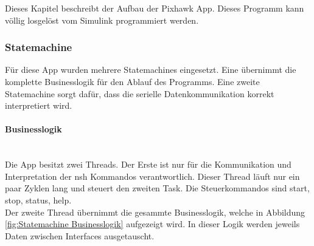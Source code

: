 Dieses Kapitel beschreibt der Aufbau der Pixhawk App. Dieses Programm kann völlig losgelöst vom Simulink programmiert werden.


\subsubsection{Statemachine}
Für diese App wurden mehrere Statemachines eingesetzt. Eine übernimmt die komplette Businesslogik für den Ablauf des Programms. Eine zweite Statemachine sorgt dafür, dass die serielle Datenkommunikation korrekt interpretiert wird.


\paragraph{Businesslogik}\mbox{}\\
Die App besitzt zwei Threads. Der Erste ist nur für die Kommunikation und Interpretation der nsh Kommandos verantwortlich. Dieser Thread läuft nur ein paar Zyklen lang und steuert den zweiten Task. Die Steuerkommandos sind start, stop, status, help.\\

\noindent Der zweite Thread übernimmt die gesammte Businesslogik, welche in Abbildung \ref{fig:Statemachine Businesslogik} aufgezeigt wird. In dieser Logik werden jeweils Daten zwischen Interfaces ausgetauscht.\\

